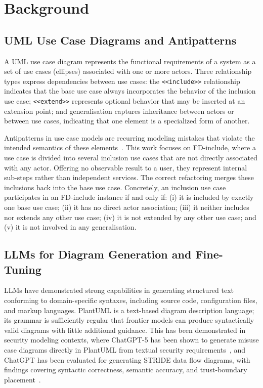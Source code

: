 \documentclass[sigconf,review,anonymous]{acmart}
\begin{document}
\section{Background}
\label{sec:background}

\subsection{UML Use Case Diagrams and Antipatterns}

A UML use case diagram represents the functional requirements of a system as
a set of use cases (ellipses) associated with one or more actors.  Three
relationship types express dependencies between use cases: the
\texttt{<<include>>} relationship indicates that the base use case always
incorporates the behavior of the inclusion use case; \texttt{<<extend>>}
represents optional behavior that may be inserted at an extension point; and
generalisation captures inheritance between actors or between use cases,
indicating that one element is a specialized form of another.

Antipatterns in use case models are recurring modeling mistakes that violate
the intended semantics of these elements~\cite{elattar2010improving}.
This work focuses on FD-include, where a use case is divided into several
inclusion use cases that are not directly associated with any actor.
Offering no observable result to a user, they represent internal sub-steps
rather than independent services.
The correct refactoring merges these inclusions back into the base use case.
Concretely, an inclusion use case participates in an FD-include instance
if and only if: (i) it is included by exactly one base use case; (ii) it has
no direct actor association; (iii) it neither includes nor extends any other
use case; (iv) it is not extended by any other use case; and (v) it is not
involved in any generalisation.

\subsection{LLMs for Diagram Generation and Fine-Tuning}

LLMs have demonstrated strong capabilities in generating
structured text conforming to domain-specific syntaxes, including source
code, configuration files, and markup languages.  PlantUML is a text-based
diagram description language; its grammar is sufficiently regular that
frontier models can produce syntactically valid diagrams with little
additional guidance.
This has been demonstrated in security modeling contexts, where ChatGPT-5 has
been shown to generate misuse case diagrams directly in PlantUML from
textual security requirements~\cite{enase26}, and ChatGPT has been
evaluated for generating STRIDE data flow diagrams, with findings covering
syntactic correctness, semantic accuracy, and trust-boundary
placement~\cite{alsayegh2026stride}.
\end{document}
